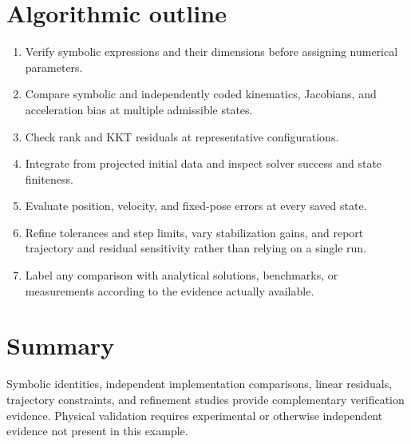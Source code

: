 \documentclass[../main.tex]{subfiles}
\begin{document}
\section{Algorithmic outline}
\begin{enumerate}
 \item Verify symbolic expressions and their dimensions before assigning numerical parameters.
 \item Compare symbolic and independently coded kinematics, Jacobians, and acceleration bias at multiple admissible states.
 \item Check rank and KKT residuals at representative configurations.
 \item Integrate from projected initial data and inspect solver success and state finiteness.
 \item Evaluate position, velocity, and fixed-pose errors at every saved state.
 \item Refine tolerances and step limits, vary stabilization gains, and report trajectory and residual sensitivity rather than relying on a single run.
 \item Label any comparison with analytical solutions, benchmarks, or measurements according to the evidence actually available.
\end{enumerate}

\section{Summary}
Symbolic identities, independent implementation comparisons, linear residuals, trajectory constraints, and refinement studies provide complementary verification evidence. Physical validation requires experimental or otherwise independent evidence not present in this example.

\ifSubfilesClassLoaded{\backmatter\bookbibliography}{}
\end{document}
